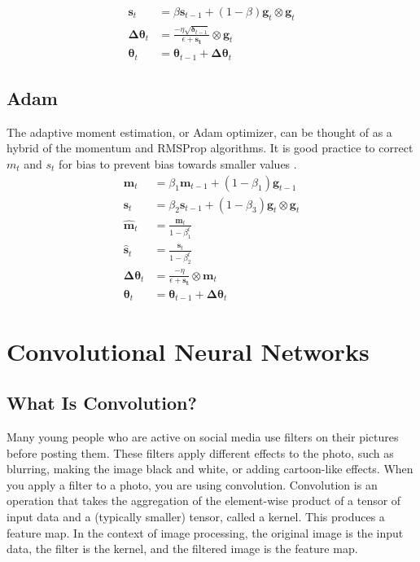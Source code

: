 \documentclass{article}
\begin{document}
\begin{align*}
    \bm{s}_t &= \beta \bm{s}_{t-1} + (1-\beta)\bm{g}_t \otimes \bm{g}_t \\
    \bm{\Delta \theta}_t &= \frac{-\eta \sqrt{\bm{\delta}_{t-1}}}{\epsilon + \bm{s_t}} \otimes \bm{g}_t \\
    \bm{\theta}_t &= \bm{\theta}_{t-1} + \bm{\Delta \theta}_t
\end{align*}

\subsection{Adam} %

The adaptive moment estimation, or Adam optimizer, can be thought of as a hybrid of the momentum and RMSProp algorithms. It is good practice to correct \(m_t\) and \(s_t\) for bias to prevent bias towards smaller values \cite{pml1book}. %
\begin{align*}
    \bm{m}_t &= \beta_1 \bm{m}_{t-1} + (1-\beta_1)\bm{g}_{t-1} \\
    \bm{s}_t &= \beta_2 \bm{s}_{t-1} + (1-\beta_3)\bm{g}_t \otimes \bm{g}_t \\
    \hat{\bm{m}}_t &= \frac{\bm{m}_t}{1-\beta^t_1} \\ 
    \hat{\bm{s}}_t &= \frac{\bm{s}_t}{1-\beta^t_2} \\ 
    \bm{\Delta \theta}_t &= \frac{-\eta}{\epsilon + \bm{s_t}} \otimes \bm{m}_t \\
    \bm{\theta}_t &= \bm{\theta}_{t-1} + \bm{\Delta \theta}_t
\end{align*}

\section{Convolutional Neural Networks}


\subsection{What Is Convolution?}

Many young people who are active on social media use filters on their pictures before posting them. These filters apply different effects to the photo, such as blurring, making the image black and white, or adding cartoon-like effects. When you apply a filter to a photo, you are using convolution. Convolution is an operation that takes the aggregation of the element-wise product of a tensor of input data and a (typically smaller) tensor, called a kernel. This produces a feature map. In the context of image processing, the original image is the input data, the filter is the kernel, and the filtered image is the feature map. 
\end{document}
